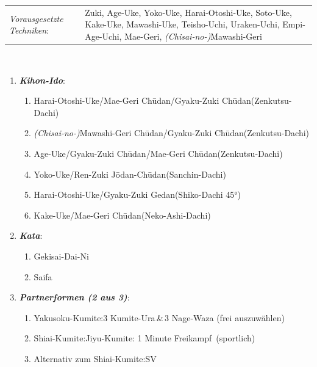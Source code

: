 	\renewcommand{\labelenumi}{\alph{enumi}.)}
\renewcommand{\labelenumii}{\arabic*.}
{\scriptsize \begin{tabularx}{\textwidth}{lX}
	\textit{Vorausgesetzte Techniken}:& Zuki, Age-Uke, Yoko-Uke, Harai-Otoshi-Uke, Soto-Uke, Kake-Uke, Mawashi-Uke, Teisho-Uchi, Uraken-Uchi, \mbox{Empi-Age-Uchi}, Mae-Geri, \textit{(Chisai-no-)}Mawashi-Geri
\end{tabularx}\\}
\begin{enumerate}[nosep]
	\item \textit{\textbf{Kihon-Ido}}:
	\begin{enumerate}[nosep]
		\item Harai-Otoshi-Uke/Mae-Geri Ch\={u}dan/Gyaku-Zuki Ch\={u}dan\tabto{280pt}(Zenkutsu-Dachi)
		\item \textit{(Chisai-no-)}Mawashi-Geri Ch\={u}dan/Gyaku-Zuki Ch\={u}dan\tabto{280pt}(Zenkutsu-Dachi)
		\item Age-Uke/Gyaku-Zuki Ch\={u}dan/Mae-Geri Ch\={u}dan\tabto{280pt}(Zenkutsu-Dachi)
		\item Yoko-Uke/Ren-Zuki J\={o}dan-Ch\={u}dan\tabto{280pt}(Sanchin-Dachi)
		\item Harai-Otoshi-Uke/Gyaku-Zuki Gedan\tabto{280pt}(Shiko-Dachi 45°)
		\item Kake-Uke/Mae-Geri Ch\={u}dan\tabto{280pt}(Neko-Ashi-Dachi)
	\end{enumerate}
	\item \textit{\textbf{Kata}}:
	\begin{enumerate}[nosep]
		\item Gekisai-Dai-Ni
		\item Saifa
	\end{enumerate}
	\item \textit{\textbf{Partnerformen (2 aus 3)}}:
	\begin{enumerate}[nosep]
		\item Yakusoku-Kumite:\tabto{200pt}3 Kumite-Ura\,\&\,3 Nage-Waza (frei auszuwählen)
		\item Shiai-Kumite:\tabto{200pt}Jiyu-Kumite: 1 Minute \frqq Freikampf\flqq~(sportlich)
		\item Alternativ zum Shiai-Kumite:\tabto{200pt}SV
	\end{enumerate}
\end{enumerate}